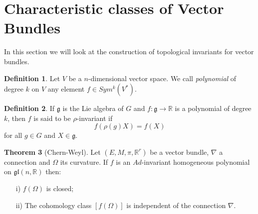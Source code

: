 \documentclass[12pt,a4paper]{report}
\theoremstyle{definition}
\newtheorem{Def}{Definition}[chapter]
\theoremstyle{Theorem}
\newtheorem{Theo}[Def]{Theorem}
\theoremstyle{definition}
\theoremstyle{definition}
\begin{document}
	\section{Characteristic classes of Vector Bundles}
	In this section we will look at the construction of topological invariants for vector bundles.
	\begin{Def}
		Let $V$ be a $n$-dimensional vector space. We call \textit{polynomial} of degree $k$ on $V$ any element $f\in Sym^k(V^*)$.
	\end{Def}
	\begin{Def}
		If $\mathfrak{g}$ is the Lie algebra of $G$ and $f:\mathfrak{g}\rightarrow \mathbb{R}$ is a polynomial of degree $k$, then $f$ is said to be $\rho$-invariant if
		$$f(\rho(g)X)=f(X)$$
		for all $g\in G$ and $X\in \mathfrak{g}$.
	\end{Def}
	\begin{Theo}[Chern-Weyl]
		Let $(E,M,\pi,\mathbb{R}^r)$ be a vector bundle, $\nabla$ a connection and $\Omega$ its curvature. If $f$ is an $Ad$-invariant homogeneous polynomial on $\mathfrak{gl}(n,\mathbb{R})$ then:
		\begin{itemize}
			\item[i)] $f(\Omega)$ is closed;
			\item[ii)] The cohomology class $[f(\Omega)]$ is independent of the connection $\nabla$.
		\end{itemize}
	\end{Theo}
\end{document}
